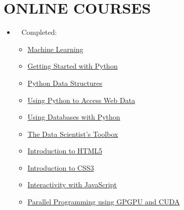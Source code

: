\section{ONLINE COURSES}
\begin{itemize}
	
	\item[] \textcolor{darkgreen}{\faCheckSquareO} ~ Completed: 
	
	\begin{multicols}{2}
	\begin{itemize}
		\item {}  \href{https://www.coursera.org/learn/machine-learning}{Machine Learning}
		
		\item {} \href{https://www.coursera.org/learn/python}{Getting Started with Python} 
		
		\item  {} \href{https://www.coursera.org/learn/python-data}{Python Data Structures}  
		
		\item {}  \href{https://www.coursera.org/learn/python-network-data}{Using Python to Access Web Data} 
		
		\item  {} \href{https://www.coursera.org/learn/python-databases}{Using Databases with Python}  
		
		\item  {}  \href{https://www.coursera.org/learn/data-scientists-tools}{The Data Scientist's Toolbox}
			 
		\item  {} \href{https://www.coursera.org/learn/html}{Introduction to HTML5} 
		
		\item  {} \href{https://www.coursera.org/learn/introcss}{Introduction to CSS3} 
		
		\item  {} \href{https://www.coursera.org/learn/javascript}{Interactivity with JavaScript}  
		
		\item  {\large{}} \href{https://www.udemy.com/introduction-to-parallel-programming-using-gpgpu-and-cuda/learn/v4/overview}{Parallel Programming using GPGPU and CUDA}
			
		
	\end{itemize}
	\end{multicols}


\end{itemize}

